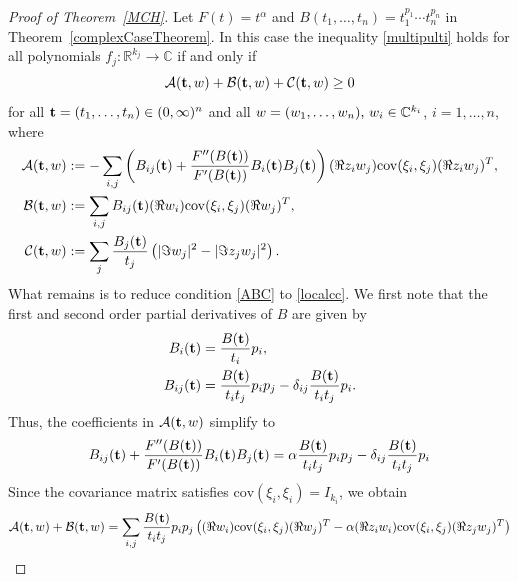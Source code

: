 \documentclass[9pt, a4paper]{amsart}
\newcommand{\1}{{\chi_{}}}%
\numberwithin{equation}{section}
\begin{document}
\begin{proof}[Proof of Theorem~\ref{MCH}]
	Let   \( F(t) = t^{\alpha} \) and \( B(t_1, \ldots, t_n) = t_1^{p_1} \cdots t_n^{p_n} \)  in Theorem~\ref{complexCaseTheorem}. In this case the inequality \eqref{multipulti} holds for all polynomials \( f_{j} : \mathbb{R}^{k_{j}} \to \mathbb{C} \) if and only if
	\begin{equation}\label{ABC}
		\mathcal{A}({\bf{t}},w) + \mathcal{B}({\bf{t}},w) + \mathcal{C}({\bf{t}},w) \geq 0
	\end{equation}
	for all \( {\bf{t}} = (t_1,\ldots,t_n) \in (0,\infty)^n \) and all \( w=(w_1,\ldots,w_n)$, $w_i \in \mathbb{C}^{k_i} \), \( i=1,\ldots,n \), where
	\begin{align*}
		\mathcal{A}({\bf{t}},w) &:= -\sum_{i,j} \left(B_{ij}({\bf{t}}) + \frac{F''(B(\bf{t}))}{F'(B(\bf{t}))} 
		B_{i}({\bf{t}}) B_{j}({\bf{t}})\right) (\Re z_{i} w_{j}) \mathrm{cov}(\xi_{i}, \xi_{j}) (\Re z_{i} w_{j})^{T}, \\
		\mathcal{B}({\bf{t}},w) &:= \sum_{i,j} B_{ij}({\bf{t}}) (\Re w_{i}) \mathrm{cov}(\xi_{i}, \xi_{j}) (\Re w_{j})^{T}, \\
		\mathcal{C}({\bf{t}},w) &:= \sum_{j} \frac{B_{j}({\bf{t}})}{t_{j}} \left( |\Im w_{j}|^2 - |\Im z_j w_{j}|^2 \right).
	\end{align*}
What remains is to reduce condition \eqref{ABC} to \eqref{localcc}. We first note that the first and second order partial derivatives of \( B \) are given by  
	\begin{align*}
		B_i({\bf{t}}) &= \frac{B({\bf{t}})}{t_i}p_i , \\
		B_{ij}({\bf{t}}) &= \frac{B({\bf{t}})}{t_i t_j} p_i p_j -\delta_{ij} \frac{B({\bf{t}})}{t_i t_j}p_i.
	\end{align*}
Thus, the coefficients in \( \mathcal{A}({\bf{t}},w) \) simplify to 
	\begin{align*}
B_{ij}({\bf{t}}) + \frac{F''(B(\bf{t}))}{F'(B(\bf{t}))} 
B_{i}({\bf{t}}) B_{j}({\bf{t}})=\alpha\frac{B({\bf{t}})}{t_i t_j}  p_i p_j-  \delta_{ij}\frac{B({\bf{t}})}{t_i t_j} p_i 
	\end{align*}
Since the covariance matrix satisfies \( \mathrm{cov}(\xi_{i}, \xi_{i}) = I_{k_i} \), we obtain  
	\begin{align*}
		\mathcal{A}({\bf{t}},w) + \mathcal{B}({\bf{t}},w) &= \sum_{i,j} \frac{B({\bf{t}})}{t_i t_j} p_i p_j 
		\left( (\Re w_{i}) \mathrm{cov}(\xi_{i}, \xi_{j}) (\Re w_{j})^{T} 
		- \alpha (\Re z_{i} w_{i}) \mathrm{cov}(\xi_{i}, \xi_{j}) (\Re z_{j} w_{j})^{T} \right) \\

\end{align*}
\end{proof}
\end{document}
